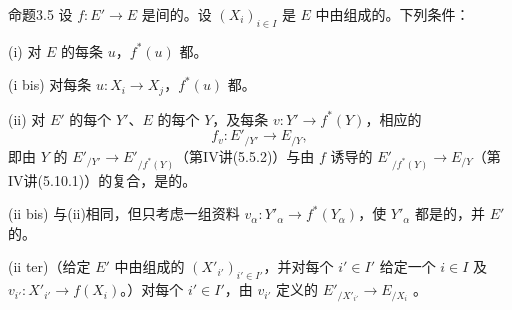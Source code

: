 \begin{SGAresult}{命题}{3.5}
设 $f:E'\to E$ 是间的。设 $(X_i)_{i\in I}$ 是 $E$ 中由组成的。下列条件：

(i) 对 $E$ 的每条 $u$，$f^*(u)$ 都。

(i bis) 对每条 $u:X_i\to X_j$，$f^*(u)$ 都。

(ii) 对 $E'$ 的每个 $Y'$、$E$ 的每个 $Y$，及每条 $v:Y'\to f^*(Y)$，相应的
\[
f_v:E'_{/Y'}\longrightarrow E_{/Y},
\]
即由 $Y$ 的 $E'_{/Y'}\to E'_{/f^*(Y)}$（第IV讲(5.5.2)）与由 $f$ 诱导的 $E'_{/f^*(Y)}\to E_{/Y}$（第IV讲(5.10.1)）的复合，是的。

(ii bis) 与(ii)相同，但只考虑一组资料 $v_\alpha:Y'_\alpha\to f^*(Y_\alpha)$，使 $Y'_\alpha$ 都是的，并 $E'$ 的。

(ii ter)（给定 $E'$ 中由组成的 $(X'_{i'})_{i'\in I'}$，并对每个 $i'\in I'$ 给定一个 $i\in I$ 及 $v_{i'}:X'_{i'}\to f(X_i)$。）对每个 $i'\in I'$，由 $v_{i'}$ 定义的 $E'_{/X'_{i'}}\to E_{/X_i}$ 。
\end{SGAresult}
